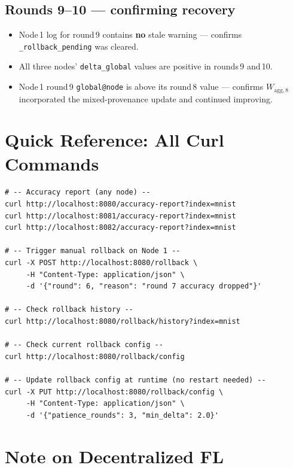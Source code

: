 \documentclass[11pt,a4paper]{article}
\newcommand{\Wagg}[1]{$W_{\text{agg},#1}$}
\begin{document}
\subsection{Rounds 9--10 --- confirming recovery}

\begin{itemize}
  \item[$\square$] Node\,1 log for round\,9 contains \textbf{no} stale
        warning --- confirms \texttt{\_rollback\_pending} was cleared.
  \item[$\square$] All three nodes' \texttt{delta\_global} values are
        positive in rounds\,9 and\,10.
  \item[$\square$] Node\,1 round\,9 \texttt{global@node} is above its
        round\,8 value --- confirms \Wagg{8} incorporated the
        mixed-provenance update and continued improving.
\end{itemize}

\newpage
\section{Quick Reference: All Curl Commands}
\label{sec:curl}

\begin{lstlisting}[style=bash]
# -- Accuracy report (any node) --
curl http://localhost:8080/accuracy-report?index=mnist
curl http://localhost:8081/accuracy-report?index=mnist
curl http://localhost:8082/accuracy-report?index=mnist

# -- Trigger manual rollback on Node 1 --
curl -X POST http://localhost:8080/rollback \
     -H "Content-Type: application/json" \
     -d '{"round": 6, "reason": "round 7 accuracy dropped"}'

# -- Check rollback history --
curl http://localhost:8080/rollback/history?index=mnist

# -- Check current rollback config --
curl http://localhost:8080/rollback/config

# -- Update rollback config at runtime (no restart needed) --
curl -X PUT http://localhost:8080/rollback/config \
     -H "Content-Type: application/json" \
     -d '{"patience_rounds": 3, "min_delta": 2.0}'
\end{lstlisting}

\section{Note on Decentralized FL}
\label{sec:decentralized}
\end{document}
